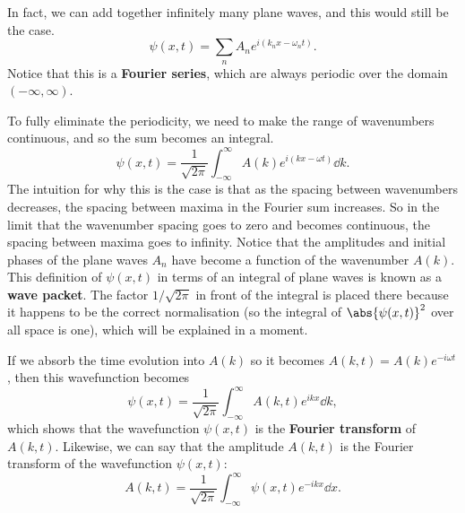 \documentclass[../quantum_mechanics.tex]{subfiles}
\begin{document}
            In fact, we can add together infinitely many plane waves, and this would still be the case.
            \begin{equation}
                \psi(x,t)=\sum_n A_ne^{i(k_nx-\omega_nt)}.
            \end{equation}
            Notice that this is a \textbf{Fourier series}, which are always periodic over the domain $(-\infty,\infty)$.

            To fully eliminate the periodicity, we need to make the range of wavenumbers continuous, and so the sum becomes an integral.
            \begin{equation}
                \psi(x,t)=\frac{1}{\sqrt{2\pi}}\int_{-\infty}^\infty A(k)e^{i(kx-\omega t)}\dd{k}.
            \end{equation}
            The intuition for why this is the case is that as the spacing between wavenumbers decreases, the spacing between maxima in the Fourier sum increases.
            So in the limit that the wavenumber spacing goes to zero and becomes continuous, the spacing between maxima goes to infinity.
            Notice that the amplitudes and initial phases of the plane waves $A_n$ have become a function of the wavenumber $A(k)$.
            This definition of $\psi(x,t)$ in terms of an integral of plane waves is known as a \textbf{wave packet}.
            The factor $1/\sqrt{2\pi}$ in front of the integral is placed there because it happens to be the correct normalisation (so the integral of $\abs{\psi(x,t)}^2$ over all space is one), which will be explained in a moment.
            
            If we absorb the time evolution into $A(k)$ so it becomes $A(k,t)=A(k)e^{-i\omega t}$, then this wavefunction becomes
            \begin{equation}\label{eq:psi-fourier}
                \psi(x,t)=\frac{1}{\sqrt{2\pi}}\int_{-\infty}^\infty A(k,t)e^{ikx}\dd{k},
            \end{equation}
            which shows that the wavefunction $\psi(x,t)$ is the \textbf{Fourier transform} of $A(k,t)$.
            Likewise, we can say that the amplitude $A(k,t)$ is the Fourier transform of the wavefunction $\psi(x,t)$:
            \begin{equation}\label{eq:psi-fourier-inverse}
                A(k,t)=\frac{1}{\sqrt{2\pi}}\int_{-\infty}^\infty\psi(x,t)e^{-ikx}\dd{x}.
            \end{equation}
            
\end{document}
